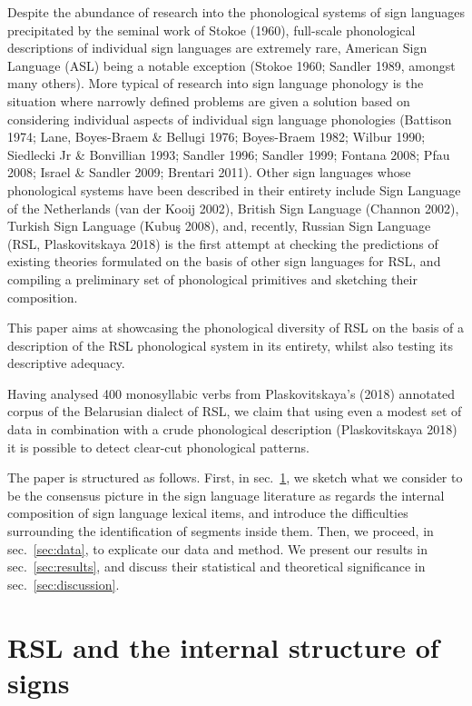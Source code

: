 Despite the abundance of research into the phonological systems of sign
languages precipitated by the seminal work of Stokoe (1960), full-scale
phonological descriptions of individual sign languages are extremely
rare, American Sign Language (ASL) being a notable exception (Stokoe
1960; Sandler 1989, amongst many others). More typical of research into
sign language phonology is the situation where narrowly defined problems
are given a solution based on considering individual aspects of
individual sign language phonologies (Battison 1974; Lane, Boyes-Braem
\& Bellugi 1976; Boyes-Braem 1982; Wilbur 1990; Siedlecki Jr \&
Bonvillian 1993; Sandler 1996; Sandler 1999; Fontana 2008; Pfau 2008;
Israel \& Sandler 2009; Brentari 2011). Other sign languages whose
phonological systems have been described in their entirety include Sign
Language of the Netherlands (van der Kooij 2002), British Sign Language
(Channon 2002), Turkish Sign Language (Kubuş 2008), and, recently,
Russian Sign Language (RSL, Plaskovitskaya 2018) is the first attempt at
checking the predictions of existing theories formulated on the basis of
other sign languages for RSL, and compiling a preliminary set of
phonological primitives and sketching their composition.

This paper aims at showcasing the phonological diversity of RSL on the
basis of a description of the RSL phonological system in its entirety,
whilst also testing its descriptive adequacy.

Having analysed 400 monosyllabic verbs from Plaskovitskaya's (2018)
annotated corpus of the Belarusian dialect of RSL, we claim that using
even a modest set of data in combination with a crude phonological
description (Plaskovitskaya 2018) it is possible to detect clear-cut
phonological patterns.

The paper is structured as follows. First, in sec.~\ref{sec:properties},
we sketch what we consider to be the consensus picture in the sign
language literature as regards the internal composition of sign language
lexical items, and introduce the difficulties surrounding the
identification of segments inside them. Then, we proceed, in
sec.~\ref{sec:data}, to explicate our data and method. We present our
results in sec.~\ref{sec:results}, and discuss their statistical and
theoretical significance in sec.~\ref{sec:discussion}.

\hypertarget{sec:properties}{%
\section{RSL and the internal structure of signs}\label{sec:properties}}

